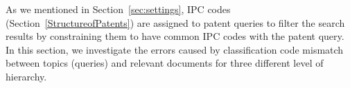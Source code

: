 
%
%
As we mentioned in Section~\ref{sec:settings}, IPC codes (Section~\ref{StructureofPatents}) 
are assigned to patent queries to filter the search results by constraining them to have common IPC codes with the patent query.
In this section, we investigate the errors caused by classification code mismatch between topics (queries) and relevant documents for three different level of hierarchy. 
 

